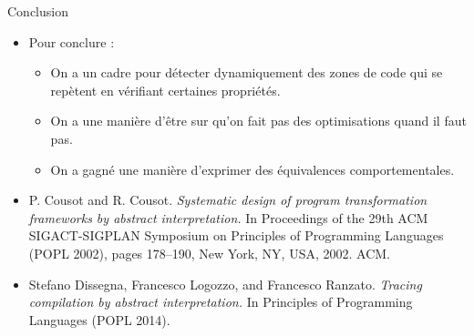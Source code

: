 \documentclass{beamer}
\begin{document}
\begin{frame}{Conclusion}
\begin{itemize}
\item Pour conclure :
\begin{itemize}
\item On a un cadre pour détecter dynamiquement des zones de code qui se
repètent en vérifiant certaines propriétés.
\item On a une manière d'être sur qu'on fait pas des optimisations quand il faut
pas.
\item On a gagné une manière d'exprimer des équivalences comportementales.
\end{itemize}
\end{itemize}
\end{frame}

\begin{frame}
\begin{itemize}
\item P. Cousot and R. Cousot. \emph{Systematic design of program transformation
frameworks by abstract interpretation.} In Proceedings of the 29th
ACM SIGACT-SIGPLAN Symposium on Principles of Programming
Languages (POPL 2002), pages 178–190, New York, NY, USA, 2002.
ACM.

\item 
Stefano Dissegna, Francesco
Logozzo, and Francesco Ranzato. \emph{Tracing compilation by abstract
interpretation.} In Principles of Programming Languages (POPL
2014).


\end{itemize}
\end{frame}
\end{document}
